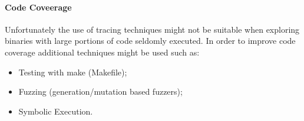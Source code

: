 \paragraph{Code Coveerage}
Unfortunately the use of tracing techniques might not be suitable when exploring binaries with large portions of code
seldomly executed.
In order to improve code coverage additional techniques might be used such as:
\begin{itemize}
    \item Testing with make (Makefile);
    \item Fuzzing (generation/mutation based fuzzers);
    \item Symbolic Execution.
\end{itemize}
